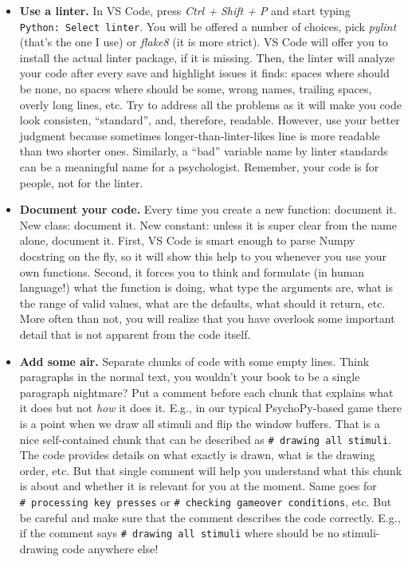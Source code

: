 \documentclass[
]{book}
\providecommand{\tightlist}{%
  \setlength{\itemsep}{0pt}\setlength{\parskip}{0pt}}
\begin{document}
\begin{itemize}
\tightlist
\item
  \textbf{Use a linter.} In VS Code, press \emph{Ctrl + Shift + P} and start typing \texttt{Python:\ Select\ linter}. You will be offered a number of choices, pick \emph{pylint} (that's the one I use) or \emph{flake8} (it is more strict). VS Code will offer you to install the actual linter package, if it is missing. Then, the linter will analyze your code after every save and highlight issues it finds: spaces where should be none, no spaces where should be some, wrong names, trailing spaces, overly long lines, etc. Try to address all the problems as it will make you code look consisten, ``standard'', and, therefore, readable. However, use your better judgment because sometimes longer-than-linter-likes line is more readable than two shorter ones. Similarly, a ``bad'' variable name by linter standards can be a meaningful name for a psychologist. Remember, your code is for people, not for the linter.
\item
  \textbf{Document your code.} Every time you create a new function: document it. New class: document it. New constant: unless it is super clear from the name alone, document it. First, VS Code is smart enough to parse Numpy docstring on the fly, so it will show this help to you whenever you use your own functions. Second, it forces you to think and formulate (in human language!) what the function is doing, what type the arguments are, what is the range of valid values, what are the defaults, what should it return, etc. More often than not, you will realize that you have overlook some important detail that is not apparent from the code itself.
\item
  \textbf{Add some air.} Separate chunks of code with some empty lines. Think paragraphs in the normal text, you wouldn't your book to be a single paragraph nightmare? Put a comment before each chunk that explains what it does but not \emph{how} it does it. E.g., in our typical PsychoPy-based game there is a point when we draw all stimuli and flip the window buffers. That is a nice self-contained chunk that can be described as \texttt{\#\ drawing\ all\ stimuli}. The code provides details on what exactly is drawn, what is the drawing order, etc. But that single comment will help you understand what this chunk is about and whether it is relevant for you at the moment. Same goes for \texttt{\#\ processing\ key\ presses} or \texttt{\#\ checking\ gameover\ conditions}, etc. But be careful and make sure that the comment describes the code correctly. E.g., if the comment says \texttt{\#\ drawing\ all\ stimuli} where should be no stimuli-drawing code anywhere else!

\end{itemize}
\end{document}
